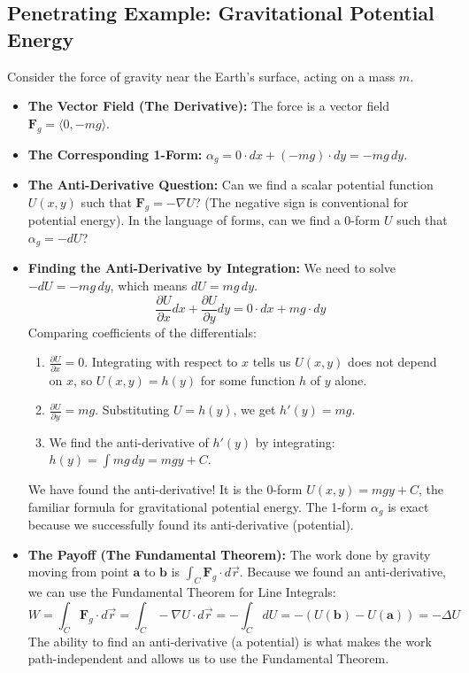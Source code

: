 \documentclass[12pt, letterpaper]{article}
\theoremstyle{definition}
\begin{document}
	\subsection{Penetrating Example: Gravitational Potential Energy}
	Consider the force of gravity near the Earth's surface, acting on a mass $m$.
	\begin{itemize}
		\item \textbf{The Vector Field (The Derivative):} The force is a vector field $\mathbf{F}_g = \langle 0, -mg \rangle$.
		
		\item \textbf{The Corresponding 1-Form:} $\alpha_g = 0 \cdot dx + (-mg) \cdot dy = -mg \, dy$.
		
		\item \textbf{The Anti-Derivative Question:} Can we find a scalar potential function $U(x,y)$ such that $\mathbf{F}_g = -\nabla U$? (The negative sign is conventional for potential energy). In the language of forms, can we find a 0-form $U$ such that $\alpha_g = -dU$?
		
		\item \textbf{Finding the Anti-Derivative by Integration:} We need to solve $-dU = -mg \, dy$, which means $dU = mg \, dy$.
		\begin{equation*}
			\frac{\partial U}{\partial x} dx + \frac{\partial U}{\partial y} dy = 0 \cdot dx + mg \cdot dy
		\end{equation*}
		Comparing coefficients of the differentials:
		\begin{enumerate}
			\item $\frac{\partial U}{\partial x} = 0$. Integrating with respect to $x$ tells us $U(x,y)$ does not depend on $x$, so $U(x,y) = h(y)$ for some function $h$ of $y$ alone.
			\item $\frac{\partial U}{\partial y} = mg$. Substituting $U=h(y)$, we get $h'(y) = mg$.
			\item We find the anti-derivative of $h'(y)$ by integrating: $h(y) = \int mg \, dy = mgy + C$.
		\end{enumerate}
		We have found the anti-derivative! It is the 0-form $U(x,y) = mgy + C$, the familiar formula for gravitational potential energy. The 1-form $\alpha_g$ is exact because we successfully found its anti-derivative (potential).
		
		\item \textbf{The Payoff (The Fundamental Theorem):} The work done by gravity moving from point $\mathbf{a}$ to $\mathbf{b}$ is $\int_C \mathbf{F}_g \cdot d\vec{r}$. Because we found an anti-derivative, we can use the Fundamental Theorem for Line Integrals:
		\begin{equation*}
			W = \int_C \mathbf{F}_g \cdot d\vec{r} = \int_C -\nabla U \cdot d\vec{r} = -\int_C dU = -(U(\mathbf{b}) - U(\mathbf{a})) = -\Delta U
		\end{equation*}
		The ability to find an anti-derivative (a potential) is what makes the work path-independent and allows us to use the Fundamental Theorem.
	\end{itemize}
	
\end{document}
